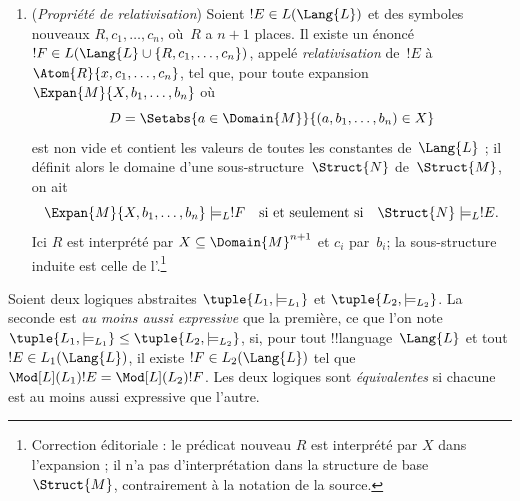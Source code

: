 \documentclass[../../../include/open-logic-section]{subfiles}
\begin{document}
\begin{defn}
\begin{enumerate}
{  quantificateurs}) Soient une
  constante $c\in\Lang{L}$,
  $!E\in L(\Lang{L})$ et
  $\Lang{L}'=\Lang{L}\setminus\{c\}$.
  Il existe un énoncé
  $!F\in L(\Lang{L}')$ tel que
  \[
  \Mod[L'](L){!F}=
    \Setabs{\Struct{M}}{
    \Expan{M}{a}\in\Mod[L](L){!E}
    \text{ pour un }a\in\Domain{M}},
  \]
  où $\Expan{M}{a}$ est l'expansion
  de~$\Struct{M}$ qui interprète~$c$
  par~$a$.\footnote{Correction éditoriale : l'énoncé $!F$ appartient au langage réduit $\Lang{L}'$, et non au langage initial indiqué par la source, puisque ses modèles sont des $\Lang{L}'$-structures.}
\item (\emph{Propriété de
  relativisation}) Soient
  $!E\in L(\Lang{L})$ et des
  symboles nouveaux $R,c_1,\dots,c_n$,
  où~$R$ a $n+1$ places. Il existe
  un énoncé
  $!F\in L(\Lang{L}\cup
  \{R,c_1,\dots,c_n\})$, appelé
  \emph{relativisation} de~$!E$
  à $\Atom{R}{x,c_1,\dots,c_n}$,
  tel que, pour toute expansion
  $\Expan{M}{X,b_1,\dots,b_n}$
  où
  \[
    D=\Setabs{a\in\Domain{M}}{
      (a,b_1,\dots,b_n)\in X}
  \]
  est non vide et contient les valeurs de toutes les constantes de~$\Lang{L}$ ; il définit alors le domaine d'une
  sous-structure~$\Struct{N}$
  de~$\Struct{M}$, on ait
  \[
    \Expan{M}{X,b_1,\dots,b_n}
      \models_L !F
    \quad\text{si et seulement si}\quad
    \Struct{N}\models_L !E.
  \]
  Ici $R$ est interprété par
  $X\subseteq\Domain{M}^{n+1}$
  et $c_i$ par~$b_i$; la
  sous-structure induite est celle
  de l'.\footnote{Correction éditoriale : le prédicat nouveau $R$ est interprété par $X$ dans l'expansion ; il n'a pas d'interprétation dans la structure de base $\Struct{M}$, contrairement à la notation de la source.}
\end{enumerate}
\end{defn}

\begin{defn}
Soient deux logiques abstraites
$\tuple{L_1,\models_{L_1}}$ et
$\tuple{L_2,\models_{L_2}}$.
La seconde est \emph{au moins aussi
expressive} que la première, ce
que l'on note
$\tuple{L_1,\models_{L_1}}
\leq\tuple{L_2,\models_{L_2}}$,
si, pour tout !!{language}~$\Lang{L}$
et tout $!E\in L_1(\Lang{L})$,
il existe $!F\in L_2(\Lang{L})$
tel que
$\Mod[L](L_1){!E}=
\Mod[L](L_2){!F}$.
Les deux logiques sont
\emph{équivalentes} si chacune
est au moins aussi expressive
que l'autre.
\end{defn}
\end{document}
